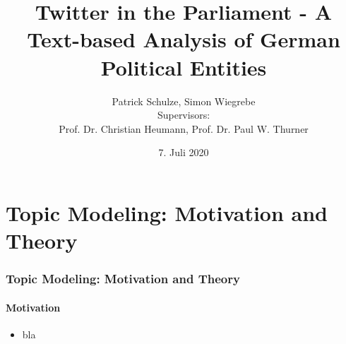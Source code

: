 \documentclass[xcolor=dvipsnames]{beamer}
\title{Twitter in the Parliament - A Text-based Analysis of German Political Entities}
\date{7. Juli 2020}
\author[author1]{Patrick Schulze, Simon Wiegrebe\\[10mm]{\small Supervisors:\\ Prof. Dr. Christian Heumann, Prof. Dr. Paul W. Thurner}}
\begin{document}
\begin{frame}
\titlepage
\end{frame}


\section{Topic Modeling: Motivation and Theory}
\begin{frame}
\frametitle{Topic Modeling: Motivation and Theory}
\framesubtitle{Motivation}
\begin{itemize}
\item bla
\end{itemize}
\end{frame}
\end{document}
